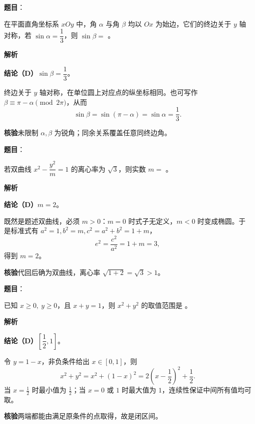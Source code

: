\begin{answer}

\textbf{题目}：

在平面直角坐标系 $xOy$ 中，角 $\alpha$ 与角 $\beta$ 均以 $Ox$ 为始边，它们的终边关于 $y$ 轴对称，若 $\sin\alpha=\dfrac13$，则 $\sin\beta=$ \gkblank{}。

\textbf{解析}

\textbf{结论（D）}$\sin\beta=\dfrac13$。

终边关于 $y$ 轴对称，在单位圆上对应点的纵坐标相同。也可写作 $\beta\equiv\pi-\alpha\pmod{2\pi}$，从而
\nopagebreak[4]
\[
\sin\beta=\sin(\pi-\alpha)=\sin\alpha=\frac13.
\]

\textbf{核验}未限制 $\alpha,\beta$ 为锐角；同余关系覆盖任意同终边角。


\end{answer}
\begin{answer}

\textbf{题目}：

若双曲线 $x^2-\dfrac{y^2}{m}=1$ 的离心率为 $\sqrt3$，则实数 $m=$ \gkblank{}。

\textbf{解析}

\textbf{结论（D）}$m=2$。

既然是题述双曲线，必须 $m>0$：$m=0$ 时式子无定义，$m<0$ 时变成椭圆。于是标准式有 $a^2=1,b^2=m,c^2=a^2+b^2=1+m$，
\nopagebreak[4]
\[
e^2=\frac{c^2}{a^2}=1+m=3,
\]
得到 $m=2$。

\textbf{核验}代回后确为双曲线，离心率 $\sqrt{1+2}=\sqrt3>1$。


\end{answer}
\begin{answer}

\textbf{题目}：

已知 $x\geqslant0,\ y\geqslant0$，且 $x+y=1$，则 $x^2+y^2$ 的取值范围是 \gkblank{}。

\textbf{解析}

\textbf{结论（D）}$\left[\dfrac12,1\right]$。

令 $y=1-x$，非负条件给出 $x\in[0,1]$，则
\nopagebreak[4]
\[
x^2+y^2=x^2+(1-x)^2=2\left(x-\frac12\right)^2+\frac12.
\]
当 $x=\frac12$ 时最小值为 $\frac12$；当 $x=0$ 或 $1$ 时最大值为 $1$，连续性保证中间所有值均可取。

\textbf{核验}两端都能由满足原条件的点取得，故是闭区间。


\end{answer}
